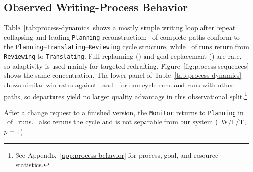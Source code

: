 \subsection{Observed Writing-Process Behavior}
\label{sec:results-process-dynamics}

Table~\ref{tab:process-dynamics} shows a mostly simple writing loop after repeat collapsing and leading-\texttt{Planning} reconstruction: \AfourCycleCompliantRate\ of complete paths conform to the \texttt{Planning}--\texttt{Translating}--\texttt{Reviewing} cycle structure, while \AfourReviewingToTranslatingRate\ of runs return from \texttt{Reviewing} to \texttt{Translating}.
Full replanning (\AfourReviewingToPlanningRate) and goal replacement (\AfourRegenerationRate) are rare, so adaptivity is used mainly for targeted redrafting.
Figure~\ref{fig:process-sequences} shows the same concentration.
The lower panel of Table~\ref{tab:process-dynamics} shows similar win rates against \condFixedOrder\ and \condSingleWriter\ for one-cycle runs and runs with other paths, so departures yield no larger quality advantage in this observational split.\footnote{See Appendix~\ref{app:process-behavior} for process, goal, and resource statistics.}

After a change request to a finished version, the \texttt{Monitor} returns to \texttt{Planning} in \RevisionAfourPlanning\ of \RevisionAfourCompleted\ runs.
\condFixedOrder\ also reruns the cycle and is not separable from our system (\RevisionFullFixedOrderWLT\ W/L/T, $p=1$).




